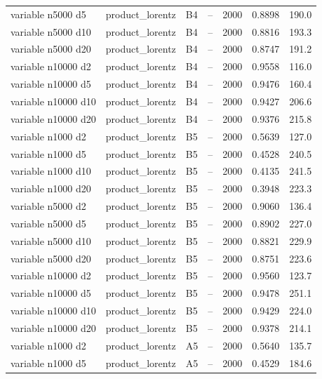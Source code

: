 \begin{longtable}{llllrrr}
variable n5000 d5 & product\_lorentz & B4 & -- & 2000 & 0.8898 & 190.0 \\
variable n5000 d10 & product\_lorentz & B4 & -- & 2000 & 0.8816 & 193.3 \\
variable n5000 d20 & product\_lorentz & B4 & -- & 2000 & 0.8747 & 191.2 \\
variable n10000 d2 & product\_lorentz & B4 & -- & 2000 & 0.9558 & 116.0 \\
variable n10000 d5 & product\_lorentz & B4 & -- & 2000 & 0.9476 & 160.4 \\
variable n10000 d10 & product\_lorentz & B4 & -- & 2000 & 0.9427 & 206.6 \\
variable n10000 d20 & product\_lorentz & B4 & -- & 2000 & 0.9376 & 215.8 \\
\rowcolor{oursbg}
variable n1000 d2 & product\_lorentz & B5 & -- & 2000 & 0.5639 & 127.0 \\
\rowcolor{oursbg}
variable n1000 d5 & product\_lorentz & B5 & -- & 2000 & 0.4528 & 240.5 \\
\rowcolor{oursbg}
variable n1000 d10 & product\_lorentz & B5 & -- & 2000 & 0.4135 & 241.5 \\
\rowcolor{oursbg}
variable n1000 d20 & product\_lorentz & B5 & -- & 2000 & 0.3948 & 223.3 \\
\rowcolor{oursbg}
variable n5000 d2 & product\_lorentz & B5 & -- & 2000 & 0.9060 & 136.4 \\
\rowcolor{oursbg}
variable n5000 d5 & product\_lorentz & B5 & -- & 2000 & 0.8902 & 227.0 \\
\rowcolor{oursbg}
variable n5000 d10 & product\_lorentz & B5 & -- & 2000 & 0.8821 & 229.9 \\
\rowcolor{oursbg}
variable n5000 d20 & product\_lorentz & B5 & -- & 2000 & 0.8751 & 223.6 \\
\rowcolor{oursbg}
variable n10000 d2 & product\_lorentz & B5 & -- & 2000 & 0.9560 & 123.7 \\
\rowcolor{oursbg}
variable n10000 d5 & product\_lorentz & B5 & -- & 2000 & 0.9478 & 251.1 \\
\rowcolor{oursbg}
variable n10000 d10 & product\_lorentz & B5 & -- & 2000 & 0.9429 & 224.0 \\
\rowcolor{oursbg}
variable n10000 d20 & product\_lorentz & B5 & -- & 2000 & 0.9378 & 214.1 \\
variable n1000 d2 & product\_lorentz & A5 & -- & 2000 & 0.5640 & 135.7 \\
variable n1000 d5 & product\_lorentz & A5 & -- & 2000 & 0.4529 & 184.6 \\

\end{longtable}
